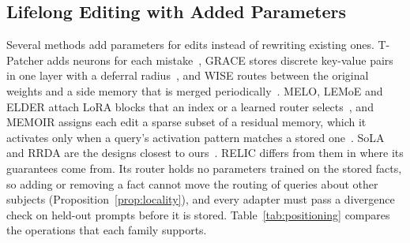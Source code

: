\documentclass[journal,10pt]{IEEEtran}
\begin{document}
\subsection{Lifelong Editing with Added Parameters}
Several methods add parameters for edits instead of rewriting existing ones. T-Patcher adds neurons for
each mistake~\cite{huang2023tpatcher}, GRACE stores discrete key-value pairs in one layer with a deferral
radius~\cite{hartvigsen2023grace}, and WISE routes between the original weights and a side memory that is
merged periodically~\cite{wang2024wise}. MELO, LEMoE and ELDER attach LoRA blocks that an index or a
learned router selects~\cite{yu2024melo,wang2024lemoe,li2025elder}, and MEMOIR assigns each edit a sparse
subset of a residual memory, which it activates only when a query's activation pattern matches a stored
one~\cite{wang2025memoir}. SoLA and RRDA are the designs closest to ours~\cite{luo2026sola,zhang2026rrda}.
RELIC differs from them in where its guarantees come from. Its router holds no parameters trained on the
stored facts, so adding or removing a fact cannot move the routing of queries about other subjects
(Proposition~\ref{prop:locality}), and every adapter must pass a divergence check on held-out prompts
before it is stored. Table~\ref{tab:positioning} compares the operations that each family supports.
\end{document}
